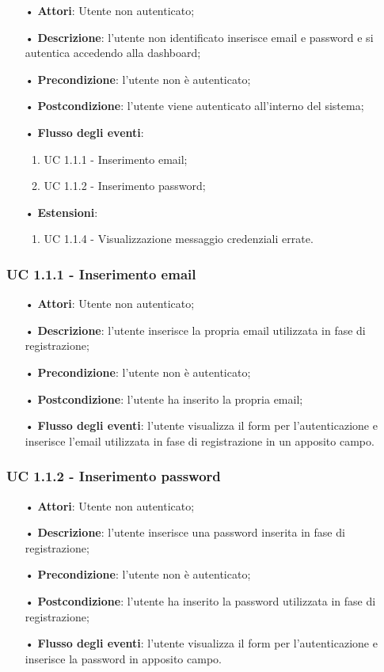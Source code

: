 \begin{itemize}
\item[•]\textbf{Attori}: Utente non autenticato;
\item[•]\textbf{Descrizione}:  l’utente non identificato inserisce email e password e si autentica accedendo alla dashboard;
\item[•]\textbf{Precondizione}: l’utente non è autenticato;
\item[•]\textbf{Postcondizione}: l’utente viene autenticato all’interno del sistema;
\item[•]\textbf{Flusso degli eventi}:
\begin{enumerate}
\item UC 1.1.1 - Inserimento email;
\item UC 1.1.2 - Inserimento password;

\end{enumerate}
\item[•]\textbf{Estensioni}:
\begin{enumerate}
\item UC 1.1.4 - Visualizzazione messaggio credenziali errate.
\end{enumerate}
\end{itemize}

\subsubsection{UC 1.1.1 - Inserimento email}
\begin{itemize}
\item[•]\textbf{Attori}: Utente non autenticato;
\item[•]\textbf{Descrizione}: l’utente inserisce la propria email utilizzata in fase di registrazione;
\item[•]\textbf{Precondizione}: l’utente non è autenticato;
\item[•]\textbf{Postcondizione}: l’utente ha inserito la propria email;
\item[•]\textbf{Flusso degli eventi}: l'utente visualizza il form per l'autenticazione e inserisce l'email utilizzata in fase di registrazione in un apposito campo.

\end{itemize}

\subsubsection{UC 1.1.2 - Inserimento password}
\begin{itemize}
\item[•]\textbf{Attori}: Utente non autenticato;
\item[•]\textbf{Descrizione}: l’utente inserisce una password inserita in fase di registrazione;
\item[•]\textbf{Precondizione}: l'utente non è autenticato;
\item[•]\textbf{Postcondizione}: l'utente ha inserito la password utilizzata in fase di registrazione;
\item[•]\textbf{Flusso degli eventi}: l'utente visualizza il form per l'autenticazione e inserisce la password in apposito campo.
\end{itemize}

